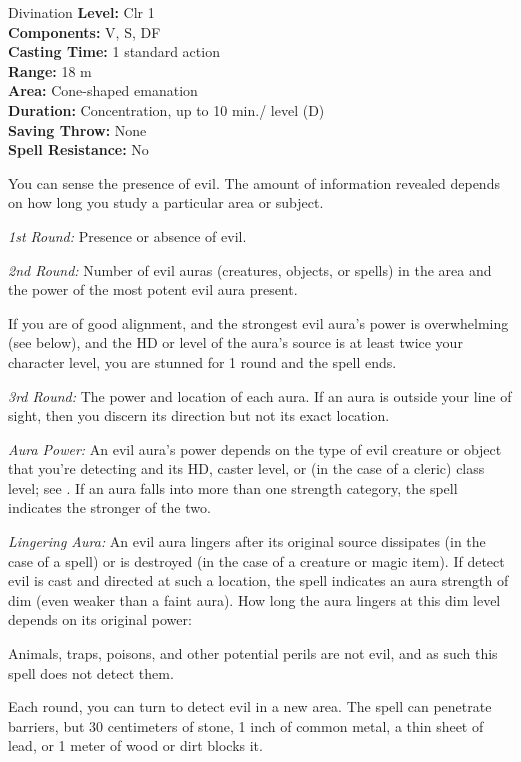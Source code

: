 {Divination}
{
	\textbf{Level:}
	Clr 1\\
	\textbf{Components:}
	V, S, DF\\
	\textbf{Casting Time:}
	1 standard action\\
	\textbf{Range:}
	18 m\\
	\textbf{Area:}
	Cone-shaped emanation\\
	\textbf{Duration:}
	Concentration, up to 10 min./ level (D)\\
	\textbf{Saving Throw:}
	None\\
	\textbf{Spell Resistance:}
	No\\
}
{
	You can sense the presence of evil. The amount of information revealed depends on how long you study a particular area or subject.

	\textit{1st Round:}
	Presence or absence of evil.

	\textit{2nd Round:}
	Number of evil auras (creatures, objects, or spells) in the area and the power of the most potent evil aura present.

	If you are of good alignment, and the strongest evil aura's power is overwhelming (see below), and the HD or level of the aura's source is at least twice your character level, you are stunned for 1 round and the spell ends.

	\textit{3rd Round:}
	The power and location of each aura. If an aura is outside your line of sight, then you discern its direction but not its exact location.

	\textit{Aura Power:}
	An evil aura's power depends on the type of evil creature or object that you're detecting and its HD, caster level, or (in the case of a cleric) class level; see . If an aura falls into more than one strength category, the spell indicates the stronger of the two.

	\textit{Lingering Aura:}
	An evil aura lingers after its original source dissipates (in the case of a spell) or is destroyed (in the case of a creature or magic item). If detect evil is cast and directed at such a location, the spell indicates an aura strength of dim (even weaker than a faint aura). How long the aura lingers at this dim level depends on its original power:


	Animals, traps, poisons, and other potential perils are not evil, and as such this spell does not detect them.

	Each round, you can turn to detect evil in a new area. The spell can penetrate barriers, but 30 centimeters of stone, 1 inch of common metal, a thin sheet of lead, or 1 meter of wood or dirt blocks it.

}
